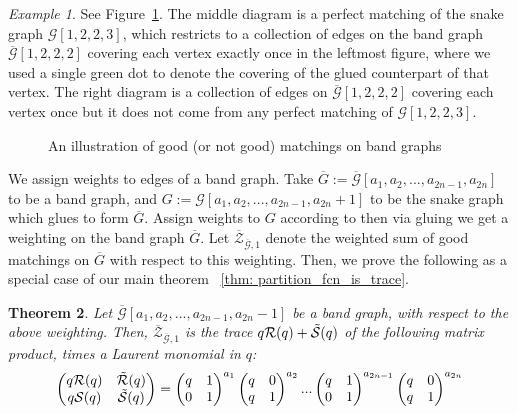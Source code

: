 \documentclass[11pt]{amsart}
\newcommand\m[1]{\begin{pmatrix}#1\end{pmatrix}}
\newtheorem{thm}{Theorem}[section]
\theoremstyle{definition}
\theoremstyle{remark}
\newtheorem{exmp}[thm]{Example}
\numberwithin{equation}{section}
\begin{document}
\begin{exmp}
    See Figure~\ref{fig:matching_on_band_graph}. The middle diagram is a perfect matching of the snake graph $\mathcal{G}[1,2,2,3]$, which restricts to a collection of edges on the band graph $\overline{\mathcal{G}}[1,2,2,2]$ covering each vertex exactly once in the leftmost figure, where we used a single green dot to denote the covering of the glued counterpart of that vertex. The right diagram is a collection of edges on $\overline{\mathcal{G}}[1,2,2,2]$ covering each vertex once but it does not come from any perfect matching of $\mathcal{G}[1,2,2,3]$.

    \begin{figure}[h!]
    \centering
    
    \caption{An illustration of good (or not good) matchings on band graphs}
    \label{fig:matching_on_band_graph}
    \end{figure}    
\end{exmp}

We assign weights to edges of a band graph. Take $\overline{G}:=\overline{\mathcal{G}}[a_1,a_2,...,a_{2n-1},a_{2n}]$ to be a band graph, and $G:=\mathcal{G}[a_1,a_2,...,a_{2n-1},a_{2n}+1]$ to be the snake graph which glues to form $\overline{G}$. Assign weights to $G$ according to  then via gluing we get a weighting on the band graph $\overline{G}$. Let $\overline{\mathcal{Z}}_{\overline{\mathcal{G}},1}$ denote the weighted sum of good matchings on $\overline{G}$ with respect to this weighting. Then, we prove the following as a special case of our main theorem ~\ref{thm: partition_fcn_is_trace}.

\begin{thm}\label{thm:weighted_band_graph_count}
    Let $\overline{\mathcal{G}}[a_1,a_2,...,a_{2n -1},a_{2n}-1]$ be a band graph, with respect to the above weighting. Then, $\overline{\mathcal{Z}}_{\overline{\mathcal{G}},1}$ is the trace $q\mathcal{R}(q)+\Tilde{\mathcal{S}}(q)$ of the following matrix product, times a Laurent monomial in $q$:
    \begin{equation}
        \begin{split}\label{eqn:simple_mtx_prod_band}
            \m{q\mathcal{R}(q)& \Tilde{\mathcal{R}}(q)\\q\mathcal{S}(q)&\Tilde{\mathcal{S}}(q)}&= \m{q& 1\\0&1}^{a_1}\m{q& 0\\q&1}^{a_2}...\m{q& 1\\0&1}^{a_{2n-1}}\m{q& 0\\q&1}^{a_{2n}}\\
        \end{split}
    \end{equation}
\end{thm}
\end{document}
